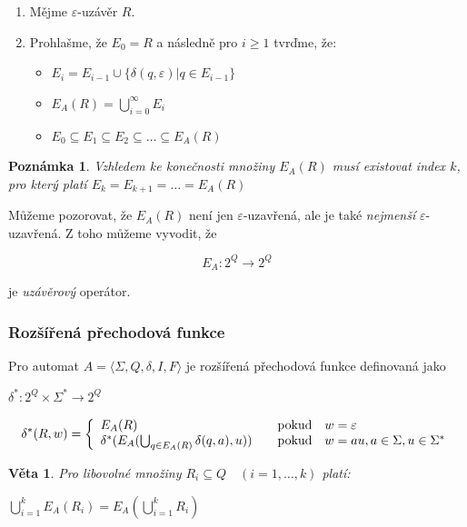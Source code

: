 \documentclass[10pt,a4paper]{article}
\theoremstyle{note}
\newtheorem{veta}{Věta}
\newtheorem{poznamka}{Poznámka}
\begin{document}
\begin{enumerate}
\item
Mějme $\varepsilon$-uzávěr $R$.

\item
Prohlašme, že $E_0=R$ a následně pro $i \geq 1$ tvrďme, že:

\begin{itemize}
\item
$E_i=E_{i-1} \cup \lbrace \delta (q,\varepsilon) | q \in E_{i-1}\rbrace$

\item
$E_A(R)=\bigcup_{i=0}^\infty E_i$

\item
$E_0 \subseteq E_1 \subseteq E_2 \subseteq \ldots \subseteq E_A(R)$
\end{itemize}
\end{enumerate}

\begin{poznamka}
Vzhledem ke konečnosti množiny $E_A(R)$ musí existovat index $k$, pro který platí $E_k = E_{k+1} = \ldots = E_A(R)$
\end{poznamka}

Můžeme pozorovat, že $E_A(R)$ není jen $\varepsilon$-uzavřená, ale je také \textit{nejmenší} $\varepsilon$-uzavřená. Z toho můžeme vyvodit, že 

$$E_A:2^Q \rightarrow 2^Q$$

je \textit{uzávěrový} operátor.

\subsubsection{Rozšířená přechodová funkce}

Pro automat $A = \langle \Sigma,Q,\delta,I,F \rangle$ je rozšířená přechodová funkce definovaná jako

$\delta^*:2^Q \times \Sigma^* \rightarrow 2^Q$

$$
\delta^*(R,w)=\left\{
\begin{array}{l@{\quad\mbox{}\quad}l}
E_A(R) & \text{pokud}\quad w=\varepsilon\\
\delta^*(E_A(\bigcup_{q \in E_A(R)}\delta(q,a),u))& \text{pokud}\quad w=au,a\in\Sigma,u\in\Sigma^*\\
\end{array}
\right.
$$

\begin{veta}
Pro libovolné množiny $R_i \subseteq Q \quad (i=1,\ldots,k)$ platí:

$\bigcup_{i=1}^k E_A(R_i)=E_A(\bigcup_{i=1}^kR_i)$
\end{veta}
\end{document}
